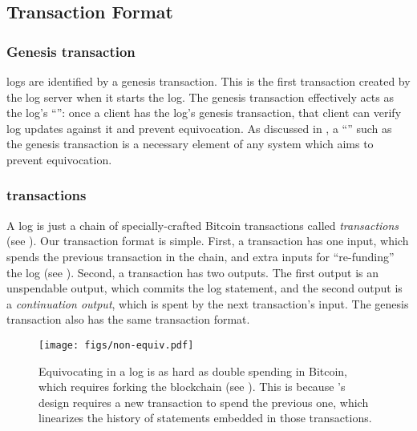 \subsection{Transaction Format}

\subsubsection{Genesis transaction}
\label{sec:catena:design:genesis}
\Sys logs are identified by a genesis transaction.
This is the first transaction created by the log server when it starts the log.
The genesis transaction effectively acts as the log's ``\pk'': once a client has the log's genesis transaction, that client can verify log updates against it and prevent equivocation.
As discussed in , a ``\pk'' such as the genesis transaction is a necessary element of any system which aims to prevent equivocation.

\subsubsection{\Sys transactions}
\label{sec:catena:design:transactions}
A \Sys log is just a chain of specially-crafted Bitcoin transactions called \emph{\Sys transactions} (see ).
Our transaction format is simple.
First, a \Sys transaction has one input, which spends the previous \Sys transaction in the chain, and extra inputs for ``re-funding'' the log (see ).
Second, a \Sys transaction has two outputs.
The first output is an unspendable \opret output, which commits the log statement, and the second output is a \emph{continuation output}, which is spent by the next \Sys transaction's input.
The genesis transaction also has the same \Sys transaction format.

\begin{figure}[t]
	\centering
	\texttt{[image: figs/non-equiv.pdf]}
	\vspace{-3.2cm}
	\caption{Equivocating in a \Sys log is as hard as double spending in Bitcoin, which requires forking the blockchain (see ). This is because \Sys's design requires a new \Sys transaction to spend the previous one, which linearizes the history of statements embedded in those transactions.}
	\label{fig:non-equivocation}
\end{figure}

